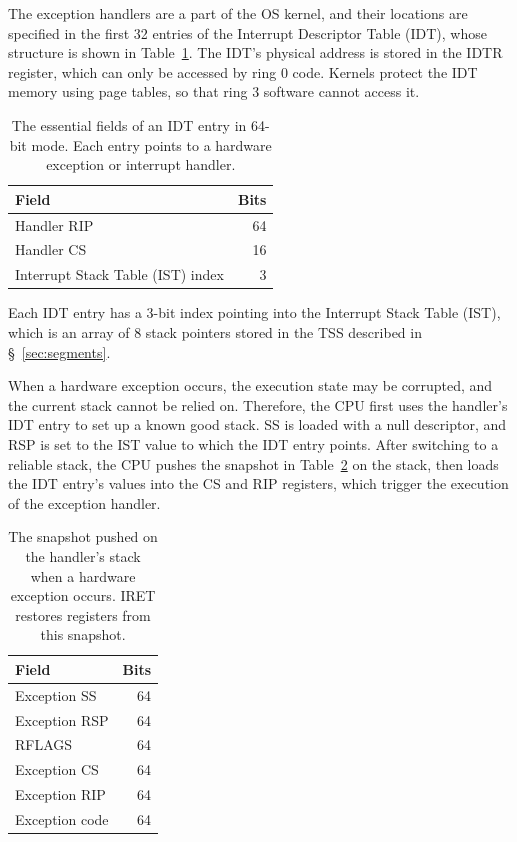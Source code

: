 The exception handlers are a part of the OS kernel, and their locations are
specified in the first 32 entries of the Interrupt Descriptor Table (IDT),
whose structure is shown in Table~\ref{fig:idt_entry}. The IDT's physical
address is stored in the IDTR register, which can only be accessed by ring 0
code. Kernels protect the IDT memory using page tables, so that ring 3 software
cannot access it.

\begin{table}[hbt]
  \centering
  \begin{tabular}{| l | r |}
  \hline
  \textbf{Field} & \textbf{Bits} \\
  \hline
  Handler RIP & 64 \\
  \hline
  Handler CS & 16 \\
  \hline
  Interrupt Stack Table (IST) index & 3 \\
  \hline
  \end{tabular}
  \caption{
    The essential fields of an IDT entry in 64-bit mode. Each entry points to a
    hardware exception or interrupt handler.
  }
  \label{fig:idt_entry}
\end{table}

Each IDT entry has a 3-bit index pointing into the Interrupt Stack Table (IST),
which is an array of 8 stack pointers stored in the TSS described in
\S~\ref{sec:segments}.


When a hardware exception occurs, the execution state may be corrupted, and the
current stack cannot be relied on. Therefore, the CPU first uses the handler's
IDT entry to set up a known good stack. SS is loaded with a null descriptor,
and RSP is set to the IST value to which the IDT entry points. After switching
to a reliable stack, the CPU pushes the snapshot in Table~\ref{fig:fault_stack}
on the stack, then loads the IDT entry's values into the CS and RIP registers,
which trigger the execution of the exception handler.

\begin{table}[hbt]
  \centering
  \begin{tabular}{| l | r |}
  \hline
  \textbf{Field} & \textbf{Bits} \\
  \hline
  Exception SS & 64 \\
  \hline
  Exception RSP & 64 \\
  \hline
  RFLAGS & 64 \\
  \hline
  Exception CS & 64 \\
  \hline
  Exception RIP & 64 \\
  \hline
  Exception code & 64 \\
  \hline
  \end{tabular}
  \caption{
    The snapshot pushed on the handler's stack when a hardware exception
    occurs. IRET restores registers from this snapshot.
  }
  \label{fig:fault_stack}
\end{table}

